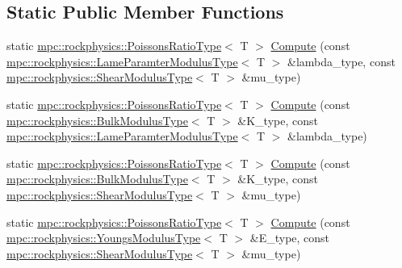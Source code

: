 \subsection*{Static Public Member Functions}
\begin{DoxyCompactItemize}
\item 
static \mbox{\hyperlink{structmpc_1_1rockphysics_1_1_poissons_ratio_type}{mpc\+::rockphysics\+::\+Poissons\+Ratio\+Type}}$<$ T $>$ \mbox{\hyperlink{structmpc_1_1rockphysics_1_1_rock_physics_transforms_3_01_t_00_01mpc_1_1rockphysics_1_1_poissons_ratio_type_3_01_t_01_4_01_4_a3a8b7dbc8559bcc4151c226dd01a9f27}{Compute}} (const \mbox{\hyperlink{structmpc_1_1rockphysics_1_1_lame_paramter_modulus_type}{mpc\+::rockphysics\+::\+Lame\+Paramter\+Modulus\+Type}}$<$ T $>$ \&lambda\+\_\+type, const \mbox{\hyperlink{structmpc_1_1rockphysics_1_1_shear_modulus_type}{mpc\+::rockphysics\+::\+Shear\+Modulus\+Type}}$<$ T $>$ \&mu\+\_\+type)
\item 
static \mbox{\hyperlink{structmpc_1_1rockphysics_1_1_poissons_ratio_type}{mpc\+::rockphysics\+::\+Poissons\+Ratio\+Type}}$<$ T $>$ \mbox{\hyperlink{structmpc_1_1rockphysics_1_1_rock_physics_transforms_3_01_t_00_01mpc_1_1rockphysics_1_1_poissons_ratio_type_3_01_t_01_4_01_4_a54e5b7e680bc85c4c5506924ba7d2962}{Compute}} (const \mbox{\hyperlink{structmpc_1_1rockphysics_1_1_bulk_modulus_type}{mpc\+::rockphysics\+::\+Bulk\+Modulus\+Type}}$<$ T $>$ \&K\+\_\+type, const \mbox{\hyperlink{structmpc_1_1rockphysics_1_1_lame_paramter_modulus_type}{mpc\+::rockphysics\+::\+Lame\+Paramter\+Modulus\+Type}}$<$ T $>$ \&lambda\+\_\+type)
\item 
static \mbox{\hyperlink{structmpc_1_1rockphysics_1_1_poissons_ratio_type}{mpc\+::rockphysics\+::\+Poissons\+Ratio\+Type}}$<$ T $>$ \mbox{\hyperlink{structmpc_1_1rockphysics_1_1_rock_physics_transforms_3_01_t_00_01mpc_1_1rockphysics_1_1_poissons_ratio_type_3_01_t_01_4_01_4_a486cac3834e73fb0836d1a904867e943}{Compute}} (const \mbox{\hyperlink{structmpc_1_1rockphysics_1_1_bulk_modulus_type}{mpc\+::rockphysics\+::\+Bulk\+Modulus\+Type}}$<$ T $>$ \&K\+\_\+type, const \mbox{\hyperlink{structmpc_1_1rockphysics_1_1_shear_modulus_type}{mpc\+::rockphysics\+::\+Shear\+Modulus\+Type}}$<$ T $>$ \&mu\+\_\+type)
\item 
static \mbox{\hyperlink{structmpc_1_1rockphysics_1_1_poissons_ratio_type}{mpc\+::rockphysics\+::\+Poissons\+Ratio\+Type}}$<$ T $>$ \mbox{\hyperlink{structmpc_1_1rockphysics_1_1_rock_physics_transforms_3_01_t_00_01mpc_1_1rockphysics_1_1_poissons_ratio_type_3_01_t_01_4_01_4_af9d0a0a7242bd0a65cacc4d6828833d8}{Compute}} (const \mbox{\hyperlink{structmpc_1_1rockphysics_1_1_youngs_modulus_type}{mpc\+::rockphysics\+::\+Youngs\+Modulus\+Type}}$<$ T $>$ \&E\+\_\+type, const \mbox{\hyperlink{structmpc_1_1rockphysics_1_1_shear_modulus_type}{mpc\+::rockphysics\+::\+Shear\+Modulus\+Type}}$<$ T $>$ \&mu\+\_\+type)

\end{DoxyCompactItemize}
